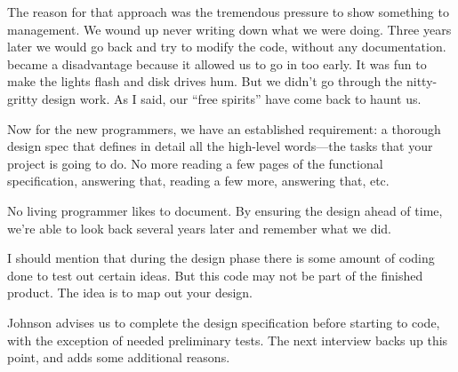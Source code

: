 \begin{interview}
\begin{tfquot}
The reason for that approach was the tremendous pressure to show
something to management. We wound up never writing down what we were
doing. Three years later we would go back and try to modify the code,
without any documentation. \Forth{} became a disadvantage because it
allowed us to go in too early. It was fun to make the lights flash and
disk drives hum. But we didn't go through the nitty-gritty design
work. As I said, our ``free spirits'' have come back to haunt us.

Now for the new programmers, we have an established requirement: a
thorough design spec that defines in detail all the high-level \Forth{}
words---the tasks that your project is going to do. No more reading a
few pages of the functional specification, answering that, reading a
few more, answering that, etc.

No living programmer likes to document. By ensuring the design ahead
of time, we're able to look back several years later and remember what
we did.

I should mention that during the design phase there is some amount of
coding done to test out certain ideas. But this code may not be part
of the finished product. The idea is to map out your design.
\end{tfquot}
\end{interview}
Johnson advises us to complete the design specification before starting
to code, with the exception of needed preliminary tests. The next
interview backs up this point, and adds some additional reasons.

